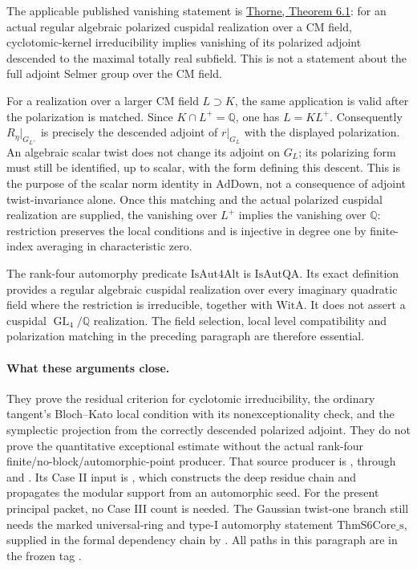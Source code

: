 The applicable published vanishing statement is
\href{https://arxiv.org/pdf/2207.04925}{Thorne, Theorem 6.1}:
for an actual regular algebraic polarized cuspidal realization
over a CM field, cyclotomic-kernel irreducibility implies
vanishing of its polarized adjoint descended to the maximal
totally real subfield.
This is not a statement about the full adjoint Selmer group
over the CM field.

For a realization over a larger CM field \(L\supset K\), the
same application is valid after the polarization is matched.
Since \(K\cap L^+=\mathbb Q\), one has \(L=KL^+\).
Consequently \(R_\eta|_{G_{L^+}}\) is precisely the descended
adjoint of \(r|_{G_L}\) with the displayed polarization.
An algebraic scalar twist does not change its adjoint on \(G_L\);
its polarizing form must still be identified, up to scalar,
with the form defining this descent.
This is the purpose of the scalar norm identity in
\(\mathrm{AdDown}\), not a consequence of adjoint
twist-invariance alone.
Once this matching and the actual polarized cuspidal realization
are supplied, the vanishing over \(L^+\) implies the vanishing
over \(\mathbb Q\): restriction preserves the local conditions
and is injective in degree one by finite-index averaging in
characteristic zero.

The rank-four automorphy predicate \(\mathrm{IsAut4Alt}\) is
\(\mathrm{IsAutQA}\). Its exact definition provides a regular
algebraic cuspidal realization over every imaginary quadratic
field where the restriction is irreducible, together with
\(\mathrm{WitA}\). It does not assert a cuspidal
\(\operatorname{GL}_4/\mathbb Q\) realization.
The field selection, local level compatibility and polarization
matching in the preceding paragraph are therefore essential.

\paragraph{What these arguments close.}
They prove the residual criterion for cyclotomic irreducibility,
the ordinary tangent's Bloch--Kato local condition with its
nonexceptionality check, and the symplectic projection from
the correctly descended polarized adjoint.
They do not prove the quantitative exceptional estimate without
the actual rank-four finite/no-block/automorphic-point producer.
That source producer is
, through
 and
.
Its Case II input is
,
which constructs the deep residue chain and propagates the modular
support from an automorphic seed.
For the present principal packet, no Case III count is needed.
The Gaussian twist-one branch still needs the marked universal-ring
and type-I automorphy statement \(\mathrm{ThmS6Core\_s}\), supplied
in the formal dependency chain by .
All paths in this paragraph are in the frozen tag
.

